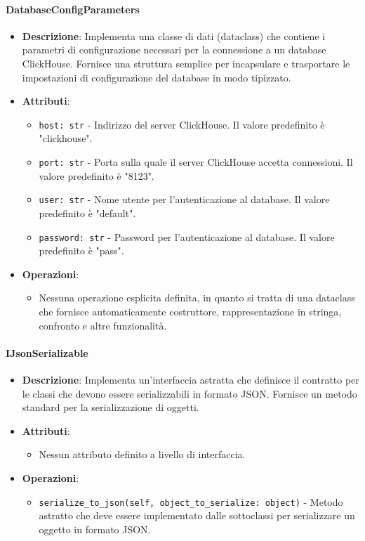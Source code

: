 \documentclass[10pt]{article}
\begin{document}
    \paragraph{DatabaseConfigParameters}
    \begin{itemize} 
    \item \textbf{Descrizione}: Implementa una classe di dati (dataclass) che contiene i parametri di configurazione necessari per la connessione a un database ClickHouse. Fornisce una struttura semplice per incapsulare e trasportare le impostazioni di configurazione del database in modo tipizzato.
    \item \textbf{Attributi}:
    \begin{itemize}
        \item \texttt{host: str} - Indirizzo del server ClickHouse. Il valore predefinito è "clickhouse".
        \item \texttt{port: str} - Porta sulla quale il server ClickHouse accetta connessioni. Il valore predefinito è "8123".
        \item \texttt{user: str} - Nome utente per l'autenticazione al database. Il valore predefinito è "default".
        \item \texttt{password: str} - Password per l'autenticazione al database. Il valore predefinito è "pass".
    \end{itemize}
    
    \item \textbf{Operazioni}:
    \begin{itemize}
        \item Nessuna operazione esplicita definita, in quanto si tratta di una dataclass che fornisce automaticamente costruttore, rappresentazione in stringa, confronto e altre funzionalità.
    \end{itemize}
    \end{itemize}

    
    \paragraph{IJsonSerializable}
    \begin{itemize} 
    \item \textbf{Descrizione}: Implementa un'interfaccia astratta che definisce il contratto per le classi che devono essere serializzabili in formato JSON. Fornisce un metodo standard per la serializzazione di oggetti.
    \item \textbf{Attributi}:
    \begin{itemize}
        \item Nessun attributo definito a livello di interfaccia.
    \end{itemize}
    
    \item \textbf{Operazioni}:
    \begin{itemize}
        \item \texttt{serialize\_to\_json(self, object\_to\_serialize: object)} - Metodo astratto che deve essere implementato dalle sottoclassi per serializzare un oggetto in formato JSON.
    \end{itemize}
    \end{itemize}
\end{document}
